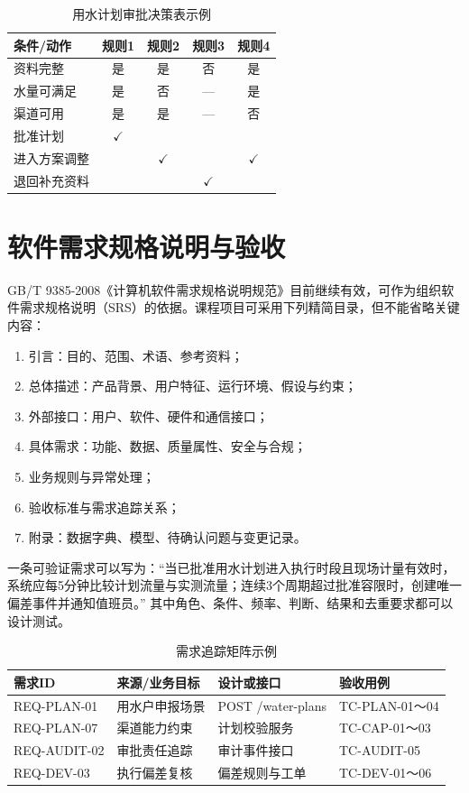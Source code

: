 \begin{table}[htbp]
\centering
\caption{用水计划审批决策表示例}
\label{tab:water-plan-decision}
\begin{tabular}{p{4.2cm}cccc}
\toprule
条件/动作 & 规则1 & 规则2 & 规则3 & 规则4 \\
\midrule
资料完整 & 是 & 是 & 否 & 是 \\
水量可满足 & 是 & 否 & — & 是 \\
渠道可用 & 是 & 是 & — & 否 \\
\midrule
批准计划 & $\checkmark$ & & & \\
进入方案调整 & & $\checkmark$ & & $\checkmark$ \\
退回补充资料 & & & $\checkmark$ & \\
\bottomrule
\end{tabular}
\end{table}

\section{软件需求规格说明与验收}

GB/T 9385-2008《计算机软件需求规格说明规范》目前继续有效，可作为组织软件需求规格说明（SRS）的依据\cite{gbt93852008}。课程项目可采用下列精简目录，但不能省略关键内容：

\begin{enumerate}
\item 引言：目的、范围、术语、参考资料；
\item 总体描述：产品背景、用户特征、运行环境、假设与约束；
\item 外部接口：用户、软件、硬件和通信接口；
\item 具体需求：功能、数据、质量属性、安全与合规；
\item 业务规则与异常处理；
\item 验收标准与需求追踪关系；
\item 附录：数据字典、模型、待确认问题与变更记录。
\end{enumerate}

一条可验证需求可以写为：“当已批准用水计划进入执行时段且现场计量有效时，系统应每5分钟比较计划流量与实测流量；连续3个周期超过批准容限时，创建唯一偏差事件并通知值班员。” 其中角色、条件、频率、判断、结果和去重要求都可以设计测试。

\begin{table}[htbp]
\centering
\caption{需求追踪矩阵示例}
\label{tab:requirements-traceability}
\begin{tabular}{p{2.0cm}p{3.6cm}p{3.2cm}p{3.2cm}}
\toprule
需求ID & 来源/业务目标 & 设计或接口 & 验收用例 \\
\midrule
REQ-PLAN-01 & 用水户申报场景 & POST /water-plans & TC-PLAN-01～04 \\
REQ-PLAN-07 & 渠道能力约束 & 计划校验服务 & TC-CAP-01～03 \\
REQ-AUDIT-02 & 审批责任追踪 & 审计事件接口 & TC-AUDIT-05 \\
REQ-DEV-03 & 执行偏差复核 & 偏差规则与工单 & TC-DEV-01～06 \\
\bottomrule
\end{tabular}
\end{table}

